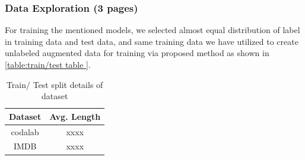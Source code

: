 \documentclass[%
	BCOR=8mm, %
	DIV=12, 
	toc=bibliography, %
	toc=listof, %
	oneside, %
	egregdoesnotlikesansseriftitles, %
	]{scrbook}
\begin{document}
\subsubsection{Data Exploration (3 pages)}
For training the mentioned models, we selected almost equal distribution of label in training data  and test data, and same training data we have utilized to create unlabeled augmented data for training via proposed method as shown in \ref{table:train/test table }. 
\begin{table}[!h]
\centering
\begin{tabular}{ |c|c| } 
\hline
Dataset &  Avg. Length  \\
\hline
codalab & xxxx  \\ 
IMDB & xxxx  \\
\hline
\end{tabular}
\caption[Train/Augment test data]{Train/ Test split details of dataset }
\label{table:Length stat }
\end{table}


\end{document}
